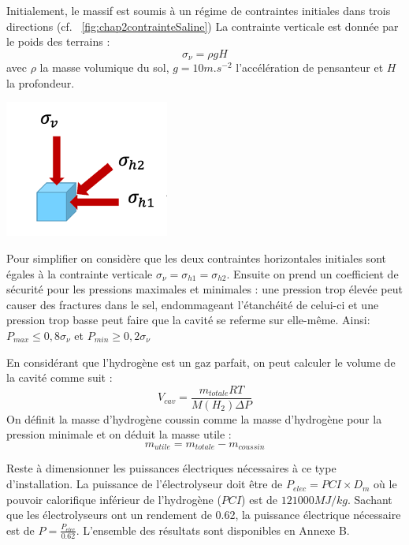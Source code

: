 \documentclass[11pt,french,a4paper]{article}
\begin{document}
\begin{multicols}{2}
Initialement, le massif est soumis à un régime de contraintes initiales dans trois directions (cf. ~\ref{fig:chap2contrainteSaline}) La contrainte verticale est donnée par le poids des terrains : $$\sigma_\nu = \rho g H $$ avec $\rho$ la masse volumique du sol, $g=10 m.s^{-2} $ l'accélération de pensanteur et $H$ la profondeur.
 
\begin{center}
\includegraphics[width=.4\linewidth]{image/chap2/cube_contraintes.png}
\label{fig:chap2contrainteSaline}
\end{center}

\end{multicols}

Pour simplifier on considère que les deux contraintes horizontales initiales sont égales à la contrainte verticale $\sigma_\nu = \sigma_{h1} = \sigma_{h2} $. Ensuite on prend un coefficient de sécurité pour les pressions maximales et minimales : une pression trop élevée peut causer des fractures dans le sel, endommageant l’étanchéité de celui-ci et une pression trop basse peut faire que la cavité se referme sur elle-même. Ainsi: \ $P_{max} \le 0,8 \sigma_{\nu}$ et $ P_{min} \ge 0,2 \sigma_{\nu} $

En considérant que l'hydrogène est un gaz parfait, on peut calculer le volume de la cavité comme suit : $$ V_{cav} = \frac{m_{totale} R T }{ M(H_2) \Delta P} $$ On définit la masse d'hydrogène coussin comme la masse d'hydrogène pour la pression minimale et on déduit la masse utile : $$ m_{utile} = m_{totale} - m_{coussin} $$

Reste à dimensionner les puissances électriques nécessaires à ce type d'installation. La puissance de l'électrolyseur doit être de $P_{elec} = PCI \times D_m $ où le pouvoir calorifique inférieur de l’hydrogène ($PCI$) est de $121 000 MJ/kg$. Sachant que les électrolyseurs ont un rendement de 0.62, la puissance électrique nécessaire est de $P=\frac{P_{elec}}{0.62}$. L'ensemble des résultats sont disponibles en Annexe B.
\end{document}

